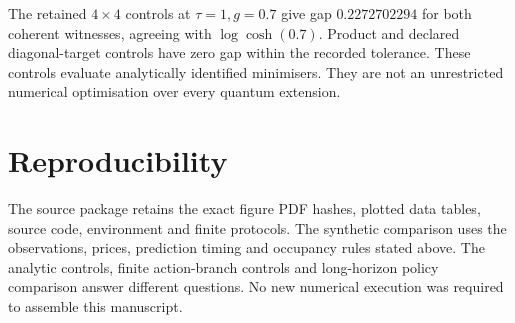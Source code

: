 The retained \(4\times4\) controls at \(\tau=1,g=0.7\) give gap \(0.2272702294\) for both coherent witnesses, agreeing with \(\log\cosh(0.7)\). Product and declared diagonal-target controls have zero gap within the recorded tolerance. These controls evaluate analytically identified minimisers. They are not an unrestricted numerical optimisation over every quantum extension.

\section{Reproducibility}
\label{app:evidence-scope}

The source package retains the exact figure PDF hashes, plotted data tables, source code, environment and finite protocols. The synthetic comparison uses the observations, prices, prediction timing and occupancy rules stated above. The analytic controls, finite action-branch controls and long-horizon policy comparison answer different questions. No new numerical execution was required to assemble this manuscript.
